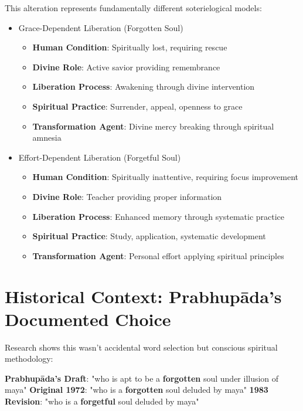\documentclass[11pt,twoside]{book}
\begin{document}
This alteration represents fundamentally different soterielogical models:
\begin{itemize}
\item Grace-Dependent Liberation (Forgotten Soul)
\label{sec:orgeb84c18}
\begin{itemize}
\item \textbf{\textbf{Human Condition}}: Spiritually lost, requiring rescue
\item \textbf{\textbf{Divine Role}}: Active savior providing remembrance
\item \textbf{\textbf{Liberation Process}}: Awakening through divine intervention
\item \textbf{\textbf{Spiritual Practice}}: Surrender, appeal, openness to grace
\item \textbf{\textbf{Transformation Agent}}: Divine mercy breaking through spiritual amnesia
\end{itemize}
\item Effort-Dependent Liberation (Forgetful Soul)
\label{sec:orgcc26d50}
\begin{itemize}
\item \textbf{\textbf{Human Condition}}: Spiritually inattentive, requiring focus improvement
\item \textbf{\textbf{Divine Role}}: Teacher providing proper information
\item \textbf{\textbf{Liberation Process}}: Enhanced memory through systematic practice
\item \textbf{\textbf{Spiritual Practice}}: Study, application, systematic development
\item \textbf{\textbf{Transformation Agent}}: Personal effort applying spiritual principles
\end{itemize}
\end{itemize}
\section*{Historical Context: Prabhupāda's Documented Choice}
\label{sec:org4de5b9f}

Research shows this wasn't accidental word selection but conscious spiritual methodology:

\textbf{\textbf{Prabhupāda's Draft}}: "who is apt to be a \textbf{\textbf{\textbf{forgotten}}} soul under illusion of maya"
\textbf{\textbf{Original 1972}}: "who is a \textbf{\textbf{\textbf{forgotten}}} soul deluded by maya"
\textbf{\textbf{1983 Revision}}: "who is a \textbf{\textbf{\textbf{forgetful}}} soul deluded by maya"
\end{document}
